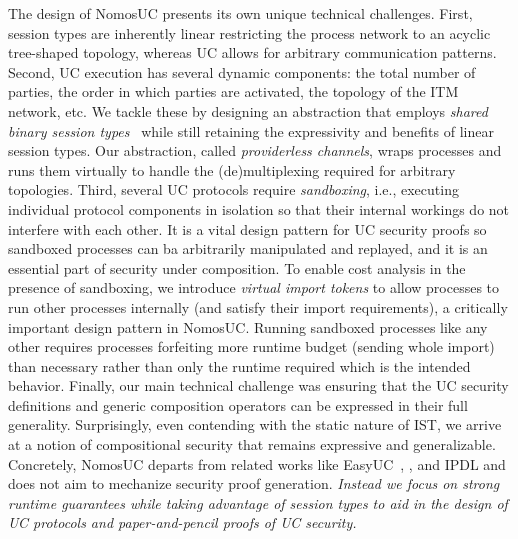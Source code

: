 
The design of NomosUC presents its own unique technical challenges.
First, session types are inherently linear restricting the process network to an acyclic tree-shaped topology,
whereas UC allows for arbitrary communication patterns.
Second, UC execution has several dynamic components: the total number of parties, the order in which parties are activated,
the topology of the ITM network, etc.
We tackle these by designing an abstraction that employs \emph{shared binary session types}~\cite{balzer2017manifest}
while still retaining the expressivity and benefits of linear session types.
Our abstraction, called \emph{providerless channels}, wraps processes and runs them virtually to handle
the (de)multiplexing required for arbitrary topologies.
Third, several UC protocols require \emph{sandboxing}, i.e., executing individual protocol components in isolation so that their
internal workings do not interfere with each other.
It is a vital design pattern for UC security proofs so sandboxed processes can ba arbitrarily manipulated and replayed, and it
is an essential part of security under composition.
To enable cost analysis in the presence of sandboxing, we introduce \emph{virtual import tokens} to allow processes to
run other processes internally (and satisfy their import requirements), a critically important design pattern in NomosUC.
Running sandboxed processes like any other requires processes forfeiting more runtime budget (sending whole import) than necessary rather than 
only the runtime required which is the intended behavior.
Finally, our main technical challenge was ensuring that the UC security definitions and generic composition operators
can be expressed in their full generality.
Surprisingly, even contending with the static nature of IST, we arrive at a notion of compositional security
that remains expressive and generalizable.
Concretely, NomosUC departs from related works like EasyUC~\cite{easyuc}, \cite{barbosa}, and IPDL\cite{ipdl} and does
not aim to mechanize security proof generation.
\emph{Instead we focus on strong runtime guarantees while taking advantage of session types to aid in the design of UC protocols and paper-and-pencil proofs of UC security.}

